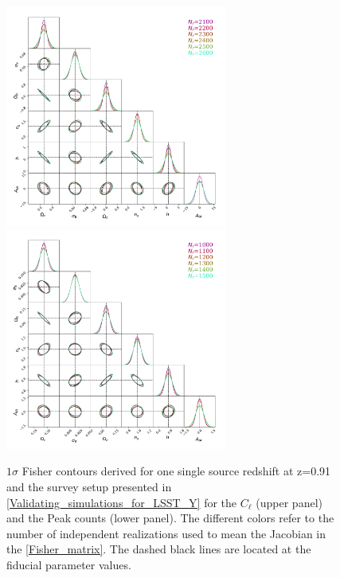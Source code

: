 \documentclass[twocolumn,twocolappendix]{aastex63}
\begin{document}
\renewcommand{\thefigure}{B\arabic{figure}}
\setcounter{figure}{0}
 \begin{figure}
    \centering
        \includegraphics[width=0.65\textwidth]{paper/figures/Fisher_stability_ps_new.pdf}
        \includegraphics[width=0.65\textwidth]{paper/figures/Fisher_stability_peak_1sigma_new.pdf}
    \caption{ $1\sigma$ Fisher contours derived for one single source redshift at z=0.91 and the survey setup presented in \autoref{Validating_simulations_for_LSST_Y} for the $C_{\ell}$ (upper panel) and the Peak counts (lower panel). The different colors refer to the number of independent realizations used to mean the Jacobian in the \autoref{Fisher_matrix}. The dashed black lines are located at the fiducial parameter values.}
     \label{fig:Fisher_stab}
\end{figure}
\end{document}

